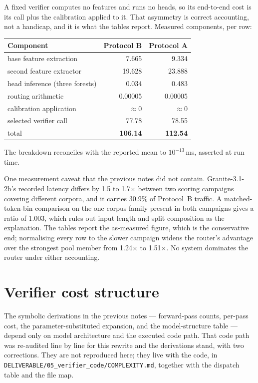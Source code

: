 \documentclass[10pt,a4paper]{article}
\newcommand{\fix}[1]{\textcolor{red!65!black}{#1}}
\begin{document}
A fixed verifier computes no features and runs no heads, so its end-to-end cost is its call plus
the calibration applied to it. That asymmetry is correct accounting, not a handicap, and it is
what the tables report. Measured components, per row:

\begin{center}\small
\begin{tabular}{lrr}
\toprule
Component & Protocol B & Protocol A \\
\midrule
base feature extraction & 7.665 & 9.334 \\
second feature extractor & 19.628 & 23.888 \\
head inference (three forests) & 0.034 & 0.483 \\
routing arithmetic & 0.00005 & 0.00005 \\
calibration application & ${\approx}0$ & ${\approx}0$ \\
selected verifier call & 77.78 & 78.55 \\
\midrule
total & \textbf{106.14} & \textbf{112.54} \\
\bottomrule
\end{tabular}
\end{center}

The breakdown reconciles with the reported mean to $10^{-13}$\,ms, asserted at run time.

\fix{One measurement caveat that the previous notes did not contain.} Granite-3.1-2b's recorded
latency differs by 1.5 to 1.7$\times$ between two scoring campaigns covering different corpora,
and it carries 30.9\% of Protocol~B traffic. A matched-token-bin comparison on the one corpus
family present in both campaigns gives a ratio of 1.003, which rules out input length and split
composition as the explanation. The tables report the as-measured figure, which is the
conservative end; normalising every row to the slower campaign widens the router's advantage over
the strongest pool member from 1.24$\times$ to 1.51$\times$. No system dominates the router under
either accounting.

\section{Verifier cost structure}

The symbolic derivations in the previous notes --- forward-pass counts, per-pass cost, the
parameter-substituted expansion, and the model-structure table --- depend only on model
architecture and the executed code path. That code path was re-audited line by line for this
rewrite and the derivations stand, with two corrections. They are not reproduced here; they live
with the code, in \texttt{DELIVERABLE/05\_verifier\_code/COMPLEXITY.md}, together with the
dispatch table and the file map.
\end{document}
